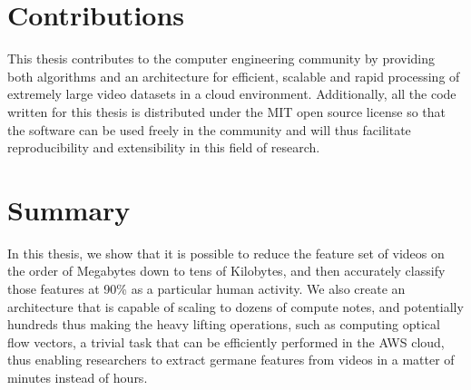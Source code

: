 \section{\label{section:contributions}Contributions}
This thesis contributes to the computer engineering community by providing both
algorithms and an architecture for efficient, scalable and rapid processing of
extremely large video datasets in a cloud environment. Additionally, all
the code written for this thesis is distributed under the MIT open source license
so that the software can be used freely in the community and will thus facilitate
reproducibility and extensibility in this field of research.

\section{\label{section:summary}Summary}
In this thesis, we show that it is possible to reduce the feature set of
videos on the order of Megabytes down to tens of Kilobytes, and then accurately
classify those features at 90\% as a particular human activity. We also create
an architecture that is capable of scaling to dozens of compute notes, and
potentially hundreds thus making the heavy lifting operations, such as computing
optical flow vectors, a trivial task that can be efficiently performed in the
AWS cloud, thus enabling researchers to extract germane features from videos in a
matter of minutes instead of hours.
